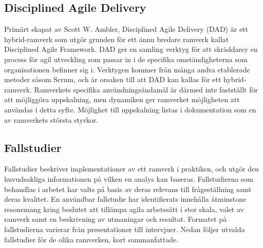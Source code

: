 	
			
		
	\subsection{Disciplined Agile Delivery}
			
		Primärt skapat av Scott W. Ambler, Disciplined Agile Delivery (DAD) är ett hybrid-ramverk som utgör grunden för ett ännu bredare ramverk kallat Disciplined Agile Framework. DAD ger en samling verktyg för att skräddarsy en process för agil utveckling som passar in i de specifika omständigheterna som organisationen befinner sig i. Verktygen kommer från många andra etablerade metoder såsom Scrum, och är orsaken till att DAD kan kallas för ett hybrid-ramverk. Ramverkets specifika användningsändamål är därmed inte fastställt för att möjliggöra uppskalning, men dynamiken ger ramverket möjligheten att användas i detta syfte. Möjlighet till uppskalning listas i dokumentation som en av ramverkets största styrkor. \cite{dad_web}
		
		
		
		
			

	
	\subsection{Fallstudier}

		Fallstudier beskriver implementationer av ett ramverk i praktiken, och utgör den huvudsakliga informationen på vilken en analys kan baseras.
		Fallstudierna som behandlas i arbetet har valts på basis av deras relevans till frågeställning samt deras kvalitet. En användbar fallstudie har identifierats innehålla åtminstone resonemang kring beslutet att tillämpa agila arbetssätt i stor skala, valet av ramverk samt en beskrivning av utmaningar och resultat. Formatet på fallstudierna varierar från presentationer till intervjuer.
		Nedan följer utvalda fallstudier för de olika ramverken, kort sammanfattade.

